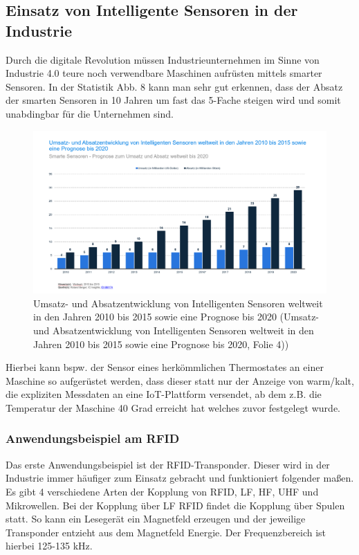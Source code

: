 \documentclass[a4paper,12pt]{scrartcl}
\begin{document}
\newpage
\subsection{Einsatz von Intelligente Sensoren in der Industrie}
Durch die digitale Revolution müssen Industrieunternehmen im Sinne von Industrie 4.0 teure noch verwendbare Maschinen aufrüsten mittels smarter Sensoren. 
In der Statistik Abb. 8 kann man sehr gut erkennen, dass der Absatz der smarten Sensoren in 10 Jahren um fast das 5-Fache steigen wird und somit unabdingbar für die Unternehmen sind.\cite{Smart strategies for smart sensors 2017, Seite 4}

\begin{figure}[H]
\centering
\includegraphics[scale=0.28]{picture/Prognose2020_1}
\caption{Umsatz- und Absatzentwicklung von Intelligenten Sensoren weltweit in den Jahren 2010 bis 2015 sowie eine Prognose bis 2020 (Umsatz- und Absatzentwicklung von Intelligenten Sensoren weltweit in den Jahren 2010 bis 2015 sowie eine Prognose bis 2020, Folie 4))}
\label{fig:Umsatz- und Absatzentwicklung von Intelligenten Sensoren weltweit in den Jahren 2010 bis 2015 Balkendiagramm}
\end{figure}

Hierbei kann bspw. der Sensor eines herkömmlichen Thermostates an einer Maschine so aufgerüstet werden, dass dieser statt nur der Anzeige von warm/kalt, die expliziten Messdaten an eine IoT-Plattform versendet, ab dem z.B. die Temperatur der Maschine 40 Grad erreicht hat welches zuvor festgelegt wurde.\cite{https://www.comarch.de/news/industrie-40/industrie-40-news/nachruestung-von-maschinen-fuer-industrie-40/}

\subsubsection{Anwendungsbeispiel am RFID}
Das erste Anwendungsbeispiel ist der RFID-Transponder. Dieser wird in der Industrie immer häufiger zum Einsatz gebracht und funktioniert folgender maßen. 
Es gibt 4 verschiedene Arten der Kopplung von RFID, LF, HF, UHF und Mikrowellen. 
Bei der Kopplung über LF RFID findet die Kopplung über Spulen statt. So kann ein Lesegerät ein Magnetfeld erzeugen und der jeweilige Transponder entzieht aus dem Magnetfeld Energie. Der Frequenzbereich ist hierbei 125-135 kHz.
\end{document}
